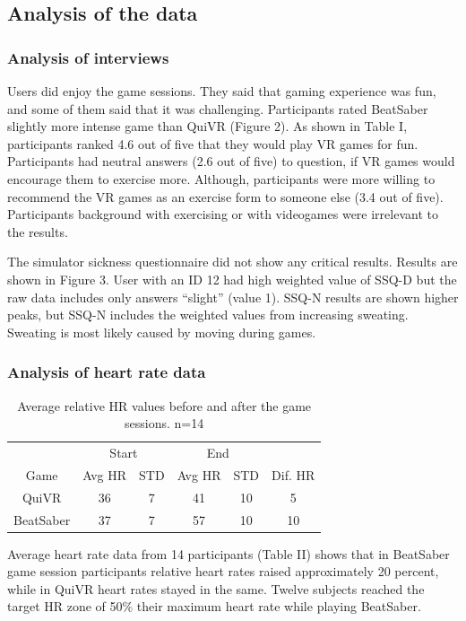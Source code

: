 \documentclass{sig-alternate-05-2015}
\begin{document}
\subsection{Analysis of the data}

\subsubsection{Analysis of interviews}
Users did enjoy the game sessions. They said that gaming experience was fun, 
and some of them said that it was challenging. Participants rated BeatSaber 
slightly more intense game than QuiVR (Figure 2). As shown in Table I, 
participants ranked 4.6 out of five that they would play VR games for fun. 
Participants had neutral answers (2.6 out of five) to question, if VR games 
would encourage them to exercise more. Although, participants were more 
willing to recommend the VR games as an exercise form to someone else 
(3.4 out of five). Participants background with exercising or with videogames 
were irrelevant to the results.

The simulator sickness questionnaire did not show any critical results. 
Results are shown in Figure 3. User with an ID 12 had high weighted value of 
SSQ-D but the raw data includes only answers “slight” (value 1). SSQ-N 
results are shown higher peaks, but SSQ-N includes the weighted values 
from increasing sweating. Sweating is most likely caused by moving during 
games.

\subsubsection{Analysis of heart rate data}
\begin{table}[]
    \centering
    \caption
    {Average relative HR values before and after the game sessions. n=14}
    \begin{tabular}{cccccc} \hline
    &\multicolumn{2}{c}{Start}&\multicolumn{2}{c}{End}\\
    Game&Avg HR&STD&Avg HR&STD&Dif. HR\\\hline
    QuiVR&36&7&41&10&5\\
    BeatSaber&37&7&57&10&10 \\ \hline
    \end{tabular}
\end{table}

Average heart rate data from 14 participants (Table II) shows that in 
BeatSaber game session participants relative heart rates raised approximately 
20 percent, while in QuiVR heart rates stayed in the same. Twelve subjects 
reached the target HR zone of 50\% their maximum heart rate while playing 
BeatSaber. 
\end{document}
